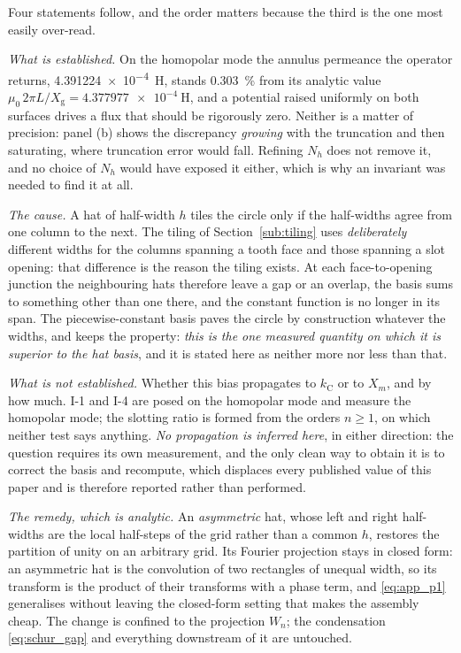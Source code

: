 \documentclass[10pt,a4paper,twocolumn]{article}
\newcommand{\Xg}{X_{\mathrm{g}}}
\theoremstyle{plain}
\theoremstyle{remark}
\begin{document}
Four statements follow, and the order matters because the third is the
one most easily over-read.

\emph{What is established.} On the homopolar mode the annulus permeance
the operator returns, \SI{4.391224e-4}{\henry}, stands
\SI{+0.303}{\percent} from its analytic value
$\mu_0\,2\pi L/\Xg=\SI{4.377977e-4}{\henry}$, and a potential raised
uniformly on both surfaces drives a flux that should be rigorously zero.
Neither is a matter of precision: panel (b) shows the discrepancy
\emph{growing} with the truncation and then saturating, where truncation
error would fall. Refining $N_h$ does not remove it, and no choice of
$N_h$ would have exposed it either, which is why an invariant was needed
to find it at all.

\emph{The cause.} A hat of half-width $h$ tiles the circle only if the
half-widths agree from one column to the next. The tiling of
Section~\ref{sub:tiling} uses \emph{deliberately} different widths for
the columns spanning a tooth face and those spanning a slot opening: that difference is the reason the tiling exists. At each face-to-opening
junction the neighbouring hats therefore leave a gap or an overlap, the
basis sums to something other than one there, and the constant function
is no longer in its span. The piecewise-constant basis paves the circle
by construction whatever the widths, and keeps the property: \emph{this
is the one measured quantity on which it is superior to the hat basis},
and it is stated here as neither more nor less than that.

\emph{What is not established.} Whether this bias propagates to
$k_{\mathrm{C}}$ or to $X_m$, and by how much. I-1 and I-4 are posed on
the homopolar mode and measure the homopolar mode; the slotting ratio is
formed from the orders $n\ge1$, on which neither test says anything. \emph{No propagation is inferred here}, in either direction: the
question requires its own measurement, and the only clean way to obtain
it is to correct the basis and recompute, which displaces every published
value of this paper and is therefore reported rather than performed.

\emph{The remedy, which is analytic.} An \emph{asymmetric} hat, whose
left and right half-widths are the local half-steps of the grid rather
than a common $h$, restores the partition of unity on an arbitrary grid.
Its Fourier projection stays in closed form: an asymmetric hat is the
convolution of two rectangles of unequal width, so its transform is the
product of their transforms with a phase term, and \eqref{eq:app_p1}
generalises without leaving the closed-form setting that makes the
assembly cheap. The change is confined to the projection $W_n$; the
condensation \eqref{eq:schur_gap} and everything downstream of it are
untouched.
\end{document}
